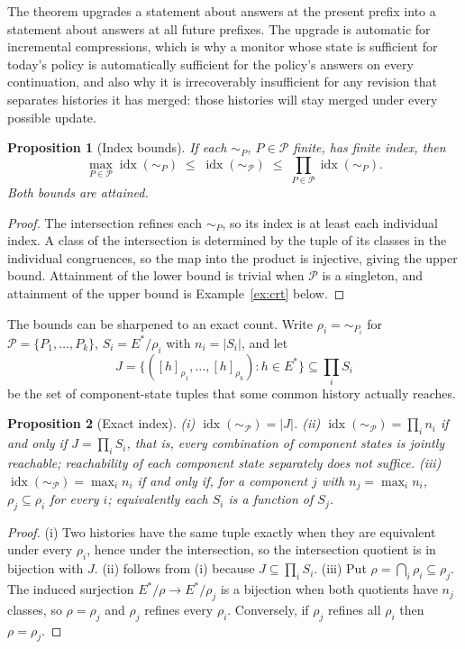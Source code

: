 \documentclass[11pt]{article}
\newtheorem{proposition}{Proposition}
\theoremstyle{definition}
\theoremstyle{remark}
\newcommand{\Ev}{E}
\newcommand{\Pol}{\mathcal{P}}
\newcommand{\nerode}[1]{\sim_{#1}}
\newcommand{\idx}{\operatorname{idx}}
\begin{document}
The theorem upgrades a statement about answers at the present prefix into a statement about answers at all future prefixes. The upgrade is automatic for incremental compressions, which is why a monitor whose state is sufficient for today's policy is automatically sufficient for the policy's answers on every continuation, and also why it is irrecoverably insufficient for any revision that separates histories it has merged: those histories will stay merged under every possible update.

\begin{proposition}[Index bounds]\label{prop:index}
If each $\nerode{P}$, $P\in\Pol$ finite, has finite index, then
\[
\max_{P\in\Pol}\idx(\nerode{P})\;\le\;\idx(\nerode{\Pol})\;\le\;\prod_{P\in\Pol}\idx(\nerode{P}).
\]
Both bounds are attained.
\end{proposition}

\begin{proof}
The intersection refines each $\nerode{P}$, so its index is at least each individual index. A class of the intersection is determined by the tuple of its classes in the individual congruences, so the map into the product is injective, giving the upper bound. Attainment of the lower bound is trivial when $\Pol$ is a singleton, and attainment of the upper bound is Example~\ref{ex:crt} below.
\end{proof}

The bounds can be sharpened to an exact count. Write $\rho_i=\nerode{P_i}$ for $\Pol=\{P_1,\dots,P_k\}$, $S_i=\Ev^{*}/\rho_i$ with $n_i=|S_i|$, and let
\[
J=\bigl\{([h]_{\rho_1},\dots,[h]_{\rho_k}):h\in\Ev^{*}\bigr\}\subseteq\prod_{i}S_i
\]
be the set of component-state tuples that some common history actually reaches.

\begin{proposition}[Exact index]\label{prop:exactindex}
(i) $\idx(\nerode{\Pol})=|J|$. (ii) $\idx(\nerode{\Pol})=\prod_i n_i$ if and only if $J=\prod_i S_i$, that is, every combination of component states is jointly reachable; reachability of each component state separately does not suffice. (iii) $\idx(\nerode{\Pol})=\max_i n_i$ if and only if, for a component $j$ with $n_j=\max_i n_i$, $\rho_j\subseteq\rho_i$ for every $i$; equivalently each $S_i$ is a function of $S_j$.
\end{proposition}

\begin{proof}
(i) Two histories have the same tuple exactly when they are equivalent under every $\rho_i$, hence under the intersection, so the intersection quotient is in bijection with $J$. (ii) follows from (i) because $J\subseteq\prod_iS_i$. (iii) Put $\rho=\bigcap_i\rho_i\subseteq\rho_j$. The induced surjection $\Ev^{*}/\rho\to\Ev^{*}/\rho_j$ is a bijection when both quotients have $n_j$ classes, so $\rho=\rho_j$ and $\rho_j$ refines every $\rho_i$. Conversely, if $\rho_j$ refines all $\rho_i$ then $\rho=\rho_j$.
\end{proof}
\end{document}
